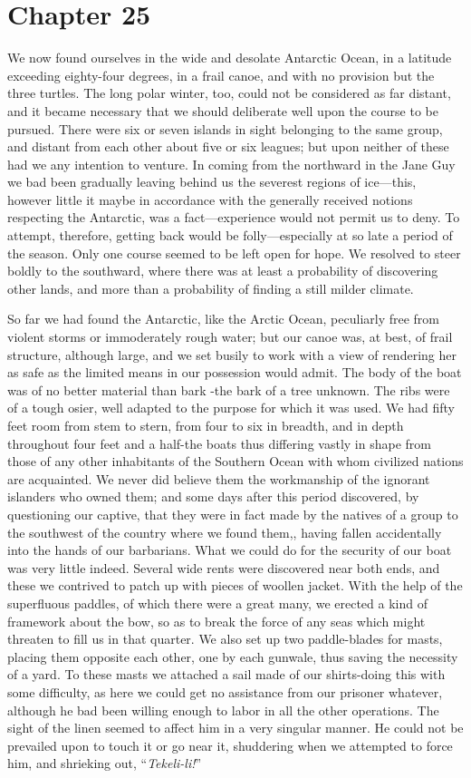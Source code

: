 \section{Chapter 25}
We now found ourselves in the wide and desolate Antarctic Ocean, in a
latitude exceeding eighty-four degrees, in a frail canoe, and with no provision
but the three turtles. The long polar winter, too, could not be considered as
far distant, and it became necessary that we should deliberate well upon the
course to be pursued. There were six or seven islands in sight belonging to the
same group, and distant from each other about five or six leagues; but upon
neither of these had we any intention to venture. In coming from the northward
in the Jane Guy we bad been gradually leaving behind us the severest regions of
ice---this, however little it maybe in accordance with the generally received
notions respecting the Antarctic, was a fact---experience would not permit us to
deny. To attempt, therefore, getting back would be folly---especially at so late
a period of the season. Only one course seemed to be left open for hope. We
resolved to steer boldly to the southward, where there was at least a
probability of discovering other lands, and more than a probability of finding a
still milder climate. 

So far we had found the Antarctic, like the Arctic Ocean, peculiarly free
from violent storms or immoderately rough water; but our canoe was, at best, of
frail structure, although large, and we set busily to work with a view of
rendering her as safe as the limited means in our possession would admit. The
body of the boat was of no better material than bark -the bark of a tree
unknown. The ribs were of a tough osier, well adapted to the purpose for which
it was used. We had fifty feet room from stem to stern, from four to six in
breadth, and in depth throughout four feet and a half-the boats thus differing
vastly in shape from those of any other inhabitants of the Southern Ocean with
whom civilized nations are acquainted. We never did believe them the workmanship
of the ignorant islanders who owned them; and some days after this period
discovered, by questioning our captive, that they were in fact made by the
natives of a group to the southwest of the country where we found them,, having
fallen accidentally into the hands of our barbarians. What we could do for the
security of our boat was very little indeed. Several wide rents were discovered
near both ends, and these we contrived to patch up with pieces of woollen
jacket. With the help of the superfluous paddles, of which there were a great
many, we erected a kind of framework about the bow, so as to break the force of
any seas which might threaten to fill us in that quarter. We also set up two
paddle-blades for masts, placing them opposite each other, one by each gunwale,
thus saving the necessity of a yard. To these masts we attached a sail made of
our shirts-doing this with some difficulty, as here we could get no assistance
from our prisoner whatever, although he bad been willing enough to labor in all
the other operations. The sight of the linen seemed to affect him in a very
singular manner. He could not be prevailed upon to touch it or go near it,
shuddering when we attempted to force him, and shrieking out,
``\emph{Tekeli-li!}'' 

